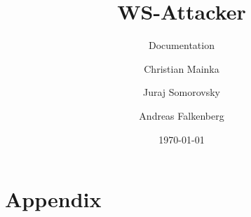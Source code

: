 \documentclass[a4paper,12pt,english,parskip=half,english]{scrartcl}
\title{WS-Attacker}
\subtitle{Documentation}
\author{Christian Mainka \and Juraj Somorovsky \and Andreas Falkenberg}
\date{\today}
\newcommand{\mysection}{}
\let\mysection=\section
\renewcommand{\section}{\pagebreak[4]\mysection}
\begin{document}
\maketitle

\begin{abstract}
    
\end{abstract}

\tableofcontents






\appendix
{}
\section*{Appendix}
\ihead[]{}
\let\section\subsection


\end{document}
